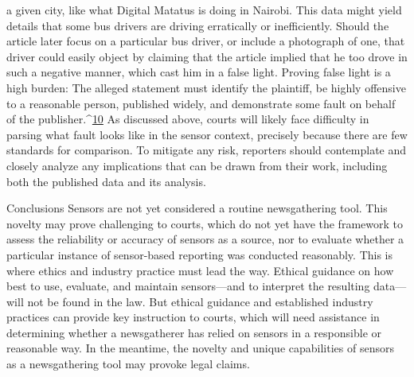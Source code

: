 a given city, like what Digital Matatus is doing in Nairobi. This data might
yield details that some bus drivers are driving erratically or inefficiently.
Should the article later focus on a particular bus driver, or include a photograph
of one, that driver could easily object by claiming that the article
implied that he too drove in such a negative manner, which cast him in a
false light.
Proving false light is a high burden: The alleged statement must identify the
plaintiff, be highly offensive to a reasonable person, published widely, and
demonstrate some fault on behalf of the publisher.^{\href{#endnotes-syed}{10}} As discussed above,
courts will likely face difficulty in parsing what fault looks like in the sensor
context, precisely because there are few standards for comparison. To mitigate
any risk, reporters should contemplate and closely analyze any implications
that can be drawn from their work, including both the published data
and its analysis.

Conclusions
Sensors are not yet considered a routine newsgathering tool. This novelty
may prove challenging to courts, which do not yet have the framework
to assess the reliability or accuracy of sensors as a source, nor to evaluate
whether a particular instance of sensor-based reporting was conducted
reasonably. This is where ethics and industry practice must lead the way.
Ethical guidance on how best to use, evaluate, and maintain sensors—and
to interpret the resulting data—will not be found in the law. But ethical
guidance and established industry practices can provide key instruction to
courts, which will need assistance in determining whether a newsgatherer
has relied on sensors in a responsible or reasonable way. In the meantime,
the novelty and unique capabilities of sensors as a newsgathering tool may
provoke legal claims.

